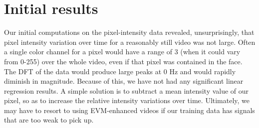 \documentclass[12pt]{article}
\begin{document}

\section{Initial results}
  Our initial computations on the pixel-intensity data revealed, unsurprisingly,
  that pixel intensity variation over time for a reasonably still video was not large.
  Often a single color channel for a pixel would have a range of 3 (when it could vary from 0-255) over the whole video, even if that pixel was contained in the face.
  The DFT of the data would produce large peaks at 0 Hz and would rapidly diminish in magnitude. Because of this, we have not had any significant linear regression results.
  A simple solution is to subtract a mean intensity value of our pixel, so as to increase the relative intensity variations over time.
  Ultimately, we may have to resort to using EVM-enhanced videos if our training data has signals that are too weak to pick up.
  
  
\end{document}
